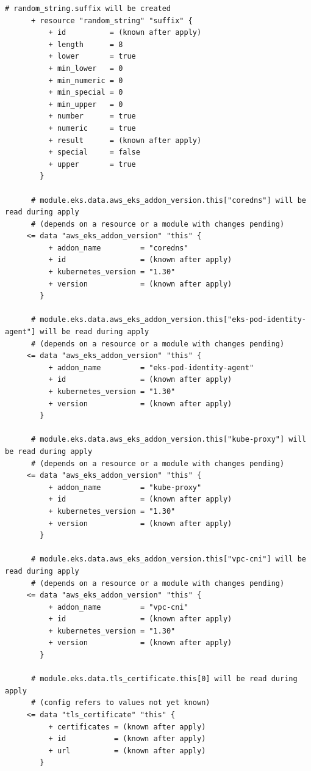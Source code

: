 \begin{lstlisting}[caption={terraform plan output for \texttt{cloudkube} provisioning}, breaklines=true, breakatwhitespace=false]
      # random_string.suffix will be created
      + resource "random_string" "suffix" {
          + id          = (known after apply)
          + length      = 8
          + lower       = true
          + min_lower   = 0
          + min_numeric = 0
          + min_special = 0
          + min_upper   = 0
          + number      = true
          + numeric     = true
          + result      = (known after apply)
          + special     = false
          + upper       = true
        }
    
      # module.eks.data.aws_eks_addon_version.this["coredns"] will be read during apply
      # (depends on a resource or a module with changes pending)
     <= data "aws_eks_addon_version" "this" {
          + addon_name         = "coredns"
          + id                 = (known after apply)
          + kubernetes_version = "1.30"
          + version            = (known after apply)
        }
    
      # module.eks.data.aws_eks_addon_version.this["eks-pod-identity-agent"] will be read during apply
      # (depends on a resource or a module with changes pending)
     <= data "aws_eks_addon_version" "this" {
          + addon_name         = "eks-pod-identity-agent"
          + id                 = (known after apply)
          + kubernetes_version = "1.30"
          + version            = (known after apply)
        }
    
      # module.eks.data.aws_eks_addon_version.this["kube-proxy"] will be read during apply
      # (depends on a resource or a module with changes pending)
     <= data "aws_eks_addon_version" "this" {
          + addon_name         = "kube-proxy"
          + id                 = (known after apply)
          + kubernetes_version = "1.30"
          + version            = (known after apply)
        }
    
      # module.eks.data.aws_eks_addon_version.this["vpc-cni"] will be read during apply
      # (depends on a resource or a module with changes pending)
     <= data "aws_eks_addon_version" "this" {
          + addon_name         = "vpc-cni"
          + id                 = (known after apply)
          + kubernetes_version = "1.30"
          + version            = (known after apply)
        }
    
      # module.eks.data.tls_certificate.this[0] will be read during apply
      # (config refers to values not yet known)
     <= data "tls_certificate" "this" {
          + certificates = (known after apply)
          + id           = (known after apply)
          + url          = (known after apply)
        }
    

\end{lstlisting}
